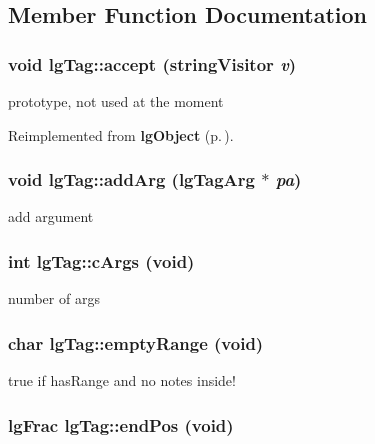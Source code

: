 \subsection{Member Function Documentation}
\subsubsection{\setlength{\rightskip}{0pt plus 5cm}void lg\-Tag::accept ({\bf string\-Visitor} {\em v})\hspace{0.3cm}{\tt  [inline]}}\label{classlgTag_a4}


prototype, not used at the moment 



Reimplemented from {\bf lg\-Object} {\rm (p.\,\pageref{classlgObject_a0})}.
\subsubsection{\setlength{\rightskip}{0pt plus 5cm}void lg\-Tag::add\-Arg ({\bf lg\-Tag\-Arg} $\ast$ {\em pa})}\label{classlgTag_a15}


add argument 

\subsubsection{\setlength{\rightskip}{0pt plus 5cm}int lg\-Tag::c\-Args (void)}\label{classlgTag_a11}


number of args 

\subsubsection{\setlength{\rightskip}{0pt plus 5cm}char lg\-Tag::empty\-Range (void)}\label{classlgTag_a23}


true if has\-Range and no notes inside! 

\subsubsection{\setlength{\rightskip}{0pt plus 5cm}lg\-Frac lg\-Tag::end\-Pos (void)}\label{classlgTag_a26}


